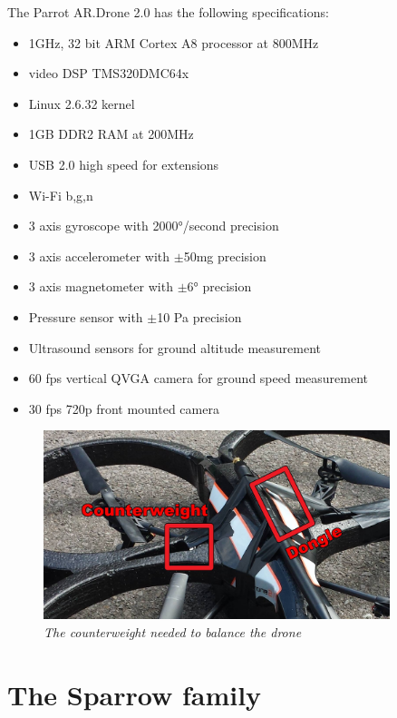 The Parrot AR.Drone 2.0 has the following specifications:
\begin{itemize}
\item   1GHz, 32 bit ARM Cortex A8 processor at 800MHz
\item   video DSP TMS320DMC64x
\item   Linux 2.6.32 kernel
\item   1GB DDR2 RAM at 200MHz
\item   USB 2.0 high speed for extensions
\item   Wi-Fi b,g,n
\item   3 axis gyroscope with 2000°/second precision
\item   3 axis accelerometer with $\pm$50mg precision
\item   3 axis magnetometer with $\pm$6° precision
\item   Pressure sensor with $\pm$10 Pa precision
\item   Ultrasound sensors for ground altitude measurement
\item   60 fps vertical QVGA camera for ground speed measurement
\item	30 fps 720p front mounted camera 	
\end{itemize}

\begin{figure}[ht]
  \label{fig:counterweight}
\begin{center}
\includegraphics[width=0.9\textwidth]{img/counterweight.png}
\end{center}
\caption{\small \itshape{The counterweight needed to balance the drone}}
\end{figure}


\section{The Sparrow family}

